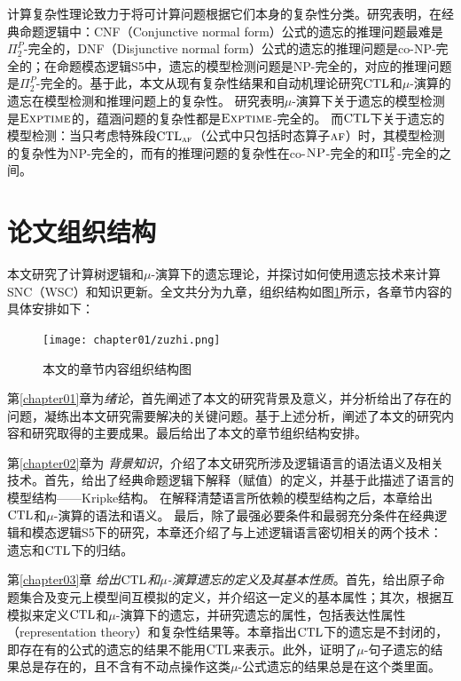 计算复杂性理论致力于将可计算问题根据它们本身的复杂性分类。研究表明，在经典命题逻辑中：CNF（Conjunctive normal form）公式的遗忘的推理问题最难是$\Pi_2^P$-完全的，DNF（Disjunctive normal form）公式的遗忘的推理问题是co-NP-完全的；在命题模态逻辑S5中，遗忘的模型检测问题是NP-完全的，对应的推理问题是$\Pi_2^P$-完全的。基于此，本文从现有复杂性结果和自动机理论研究$\textrm{CTL}$和$\mu$-演算的遗忘在模型检测和推理问题上的复杂性。
研究表明$\mu$-演算下关于遗忘的模型检测是$\textsc{Exptime}$的，蕴涵问题的复杂性都是$\textsc{Exptime}$-完全的。
而$\textrm{CTL}$下关于遗忘的模型检测：当只考虑特殊段$\textrm{CTL}_{\textsc{a} \textsc{f}}$（公式中只包括时态算子$\textsc{a} \textsc{f}$）时，其模型检测的复杂性为\textsc{NP}-完全的，而有的推理问题的复杂性在co-$\textsc{NP}$-完全的和$\Pi_2^{\textsc{P}}$-完全的之间。








\section{论文组织结构}
本文研究了计算树逻辑和$\mu$-演算下的遗忘理论，并探讨如何使用遗忘技术来计算SNC（WSC）和知识更新。全文共分为九章，组织结构如图\ref{fig:chapter1-research-structure}所示，各章节内容的具体安排如下：


\begin{figure}[htbp]
	\centering
	\texttt{[image: chapter01/zuzhi.png]}
	\caption{本文的章节内容组织结构图}
	\label{fig:chapter1-research-structure}
\end{figure}

第\ref{chapter01}章为\textit{绪论}，首先阐述了本文的研究背景及意义，并分析给出了存在的问题，凝练出本文研究需要解决的关键问题。基于上述分析，阐述了本文的研究内容和研究取得的主要成果。最后给出了本文的章节组织结构安排。


第\ref{chapter02}章为 {\em 背景知识}，介绍了本文研究所涉及逻辑语言的语法语义及相关技术。首先，给出了经典命题逻辑下解释（赋值）的定义，并基于此描述了语言的模型结构——Kripke结构。
在解释清楚语言所依赖的模型结构之后，本章给出$\textrm{CTL}$和$\mu$-演算的语法和语义。
最后，除了最强必要条件和最弱充分条件在经典逻辑和模态逻辑S5下的研究，本章还介绍了与上述逻辑语言密切相关的两个技术：遗忘和$\textrm{CTL}$下的归结。



第\ref{chapter03}章 {\em 给出$\textrm{CTL}$和$\mu$-演算遗忘的定义及其基本性质}。首先，给出原子命题集合及变元上模型间互模拟的定义，并介绍这一定义的基本属性；其次，根据互模拟来定义$\textrm{CTL}$和$\mu$-演算下的遗忘，并研究遗忘的属性，包括表达性属性（representation theory）和复杂性结果等。本章指出$\textrm{CTL}$下的遗忘是不封闭的，即存在有的公式的遗忘的结果不能用$\textrm{CTL}$来表示。此外，证明了$\mu$-句子遗忘的结果总是存在的，且不含有不动点操作这类$\mu$-公式遗忘的结果总是在这个类里面。

